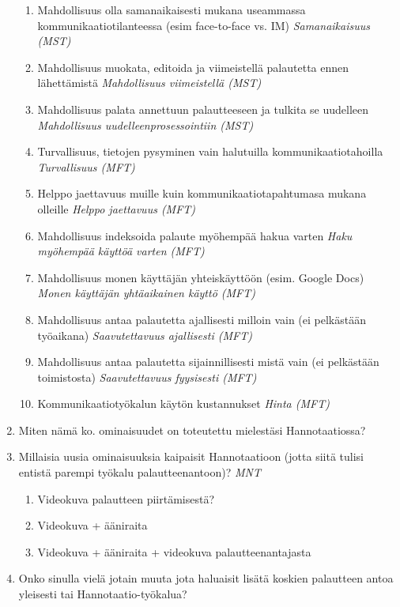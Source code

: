 \documentclass[english,12pt,a4paper,pdftex]{article}
\begin{document}
\begin{enumerate}
\begin{enumerate}
    \item Mahdollisuus olla samanaikaisesti mukana useammassa kommunikaatiotilanteessa (esim face-to-face vs. IM) \textit{Samanaikaisuus (MST)}
    
    \item Mahdollisuus muokata, editoida ja viimeistellä palautetta ennen lähettämistä \textit{Mahdollisuus viimeistellä (MST)}
    
    \item Mahdollisuus palata annettuun palautteeseen ja tulkita se uudelleen \textit{Mahdollisuus uudelleenprosessointiin (MST)}
    
    \item Turvallisuus, tietojen pysyminen vain halutuilla kommunikaatiotahoilla \textit{Turvallisuus (MFT)}
    
    \item Helppo jaettavuus muille kuin kommunikaatiotapahtumasa mukana olleille \textit{Helppo jaettavuus (MFT)}
    
    \item Mahdollisuus indeksoida palaute myöhempää hakua varten \textit{Haku myöhempää käyttöä varten (MFT)}
    
    \item Mahdollisuus monen käyttäjän yhteiskäyttöön (esim. Google Docs) \textit{Monen käyttäjän yhtäaikainen käyttö (MFT)}
    
    \item Mahdollisuus antaa palautetta ajallisesti milloin vain (ei pelkästään työaikana) \textit{Saavutettavuus ajallisesti (MFT)}
    
    \item Mahdollisuus antaa palautetta sijainnillisesti mistä vain (ei pelkästään toimistosta) \textit{Saavutettavuus fyysisesti (MFT)}
    
    \item Kommunikaatiotyökalun käytön kustannukset \textit{Hinta (MFT)}
    
  \end{enumerate}
  
\item Miten nämä ko. ominaisuudet on toteutettu mielestäsi Hannotaatiossa?
  
\item Millaisia uusia ominaisuuksia kaipaisit Hannotaatioon (jotta siitä tulisi entistä parempi työkalu palautteenantoon)? \textit{MNT}
  \begin{enumerate}
    \item Videokuva palautteen piirtämisestä?
    \item Videokuva + ääniraita
    \item Videokuva + ääniraita + videokuva palautteenantajasta
  \end{enumerate}

\item Onko sinulla vielä jotain muuta jota haluaisit lisätä koskien palautteen antoa yleisesti tai Hannotaatio-työkalua?
  
\end{enumerate}

\clearpage
\end{document}
